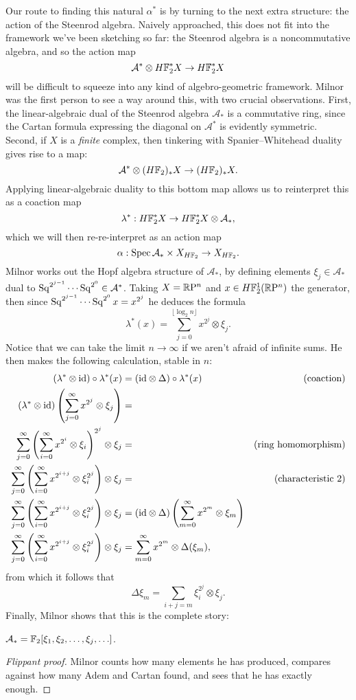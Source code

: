 Our route to finding this natural $\alpha^*$ is by turning to the next extra structure: the action of the Steenrod algebra.  Naively approached, this does not fit into the framework we've been sketching so far: the Steenrod algebra is a noncommutative algebra, and so the action map \[\mathcal A^* \otimes H\mathbb F_2^* X \to H\mathbb F_2^* X\] will be difficult to squeeze into any kind of algebro-geometric framework.  Milnor was the first person to see a way around this, with two crucial observations.  First, the linear-algebraic dual of the Steenrod algebra $\mathcal A_*$ is a commutative ring, since the Cartan formula expressing the diagonal on $\mathcal A^*$ is evidently symmetric.  Second, if $X$ is a \emph{finite} complex, then tinkering with Spanier--Whitehead duality gives rise to a map: \[\mathcal A^* \otimes (H\mathbb F_2)_* X \to (H\mathbb F_2)_* X.\]  Applying linear-algebraic duality to this bottom map allows us to reinterpret this as a coaction map \[\lambda^*: H\mathbb F_2^* X \to H\mathbb F_2^* X \otimes \mathcal A_*,\] which we will then re-re-interpret as an action map \[\alpha: \operatorname{Spec} \mathcal A_* \times X_{H\mathbb F_2} \to X_{H\mathbb F_2}.\]  Milnor works out the Hopf algebra structure of $\mathcal A_*$, by defining elements $\xi_j \in \mathcal A_*$ dual to $\operatorname{Sq}^{2^{j-1}} \cdots \operatorname{Sq}^{2^0} \in \mathcal A^*$.  Taking $X = \mathbb R\mathrm P^n$ and $x \in H\mathbb F_2^1(\mathbb R\mathrm P^n)$ the generator, then since $\operatorname{Sq}^{2^{j-1}} \cdots \operatorname{Sq}^{2^0} x = x^{2^j}$ he deduces the formula \[\lambda^*(x) = \sum_{j=0}^{\lfloor \log_2 n \rfloor} x^{2^j} \otimes \xi_j.\]  Notice that we can take the limit $n \to \infty$ if we aren't afraid of infinite sums.  He then makes the following calculation, stable in $n$:
\begin{align*}
(\lambda^* \otimes \mathrm{id}) \circ \lambda^*(x) & = (\mathrm{id} \otimes \Delta) \circ \lambda^*(x) & \text{(coaction)} \\
(\lambda^* \otimes \mathrm{id}) \left( \sum_{j=0}^\infty x^{2^j} \otimes \xi_j \right) & = \\
\sum_{j=0}^\infty \left( \sum_{i=0}^\infty x^{2^i} \otimes \xi_i \right)^{2^j} \otimes \xi_j & = & \text{(ring homomorphism)} \\
\sum_{j=0}^\infty \left( \sum_{i=0}^\infty x^{2^{i+j}} \otimes \xi_i^{2^j} \right) \otimes \xi_j & = & \text{(characteristic $2$)} \\
\sum_{j=0}^\infty \left( \sum_{i=0}^\infty x^{2^{i+j}} \otimes \xi_i^{2^j} \right) \otimes \xi_j & = (\mathrm{id} \otimes \Delta) \left( \sum_{m=0}^\infty x^{2^m} \otimes \xi_m \right) \\
\sum_{j=0}^\infty \left( \sum_{i=0}^\infty x^{2^{i+j}} \otimes \xi_i^{2^j} \right) \otimes \xi_j & = \sum_{m=0}^\infty x^{2^m} \otimes \Delta(\xi_m),
\end{align*}
from which it follows that \[\Delta \xi_m = \sum_{i+j=m} \xi_i^{2^j} \otimes \xi_j.\]  Finally, Milnor shows that this is the complete story:
\begin{theorem}[Milnor]
$\mathcal A_* = \mathbb F_2[\xi_1, \xi_2, \ldots, \xi_j, \ldots]$.
\end{theorem}
\begin{proof}[Flippant proof]
Milnor counts how many elements he has produced, compares against how many Adem and Cartan found, and sees that he has exactly enough.
\end{proof}

